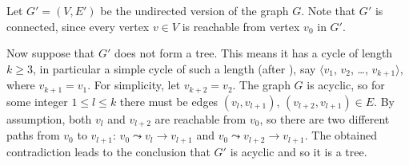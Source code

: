 \exercise
Let $G'=(V,E')$ be the undirected version of the graph $G$.
Note that $G'$ is connected, since every vertex $v\in V$ is reachable from vertex $v_0$ in $G'$.

Now suppose that $G'$ does not form a tree.
This means it has a cycle of length $k\ge3$, in particular a simple cycle of such a length (after ), say $\langle v_1$, $v_2$, \dots, $v_{k+1}\rangle$, where $v_{k+1}=v_1$.
For simplicity, let $v_{k+2}=v_2$.
The graph $G$ is acyclic, so for some integer $1\le l\le k$ there must be edges $(v_l,v_{l+1})$, $(v_{l+2},v_{l+1})\in E$.
By assumption, both $v_l$ and $v_{l+2}$ are reachable from $v_0$, so there are two different paths from $v_0$ to $v_{l+1}$: $v_0\leadsto v_l\to v_{l+1}$ and $v_0\leadsto v_{l+2}\to v_{l+1}$.
The obtained contradiction leads to the conclusion that $G'$ is acyclic and so it is a tree.
